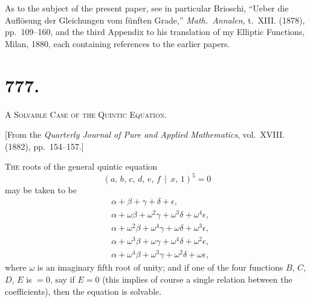 \documentclass[11pt,a4paper]{article}
\theoremstyle{cayley}
\begin{document}
As to the subject of the present paper, see in particular Brioschi, ``Ueber die Aufl\"{o}sung der Gleichungen vom f\"{u}nften Grade,'' \textit{Math.\ Annalen}, t.~XIII. (1878), pp.~109--160, and the third Appendix to his translation of my Elliptic Functions, Milan, 1880, each containing references to the earlier papers.

\newpage

\section*{777.}

\begin{center}
\Large\scshape A Solvable Case of the Quintic Equation.
\end{center}

\begin{center}
[From the \textit{Quarterly Journal of Pure and Applied Mathematics}, vol.~XVIII. (1882), pp.~154--157.]
\end{center}

\textsc{The} roots of the general quintic equation
\[
(a,\, b,\, c,\, d,\, e,\, f \,\!\!\mid\!\!\, x,\, 1)^{5} = 0
\]
may be taken to be
\begin{align*}
&\alpha + \beta + \gamma + \delta + \epsilon,\\
&\alpha + \omega\beta + \omega^{2}\gamma + \omega^{3}\delta + \omega^{4}\epsilon,\\
&\alpha + \omega^{2}\beta + \omega^{4}\gamma + \omega\delta + \omega^{3}\epsilon,\\
&\alpha + \omega^{3}\beta + \omega\gamma + \omega^{4}\delta + \omega^{2}\epsilon,\\
&\alpha + \omega^{4}\beta + \omega^{3}\gamma + \omega^{2}\delta + \omega\epsilon,
\end{align*}
where $\omega$ is an imaginary fifth root of unity; and if one of the four functions $B$, $C$, $D$, $E$ is $=0$, say if $E=0$ (this implies of course a single relation between the coefficients), then the equation is solvable.
\end{document}
